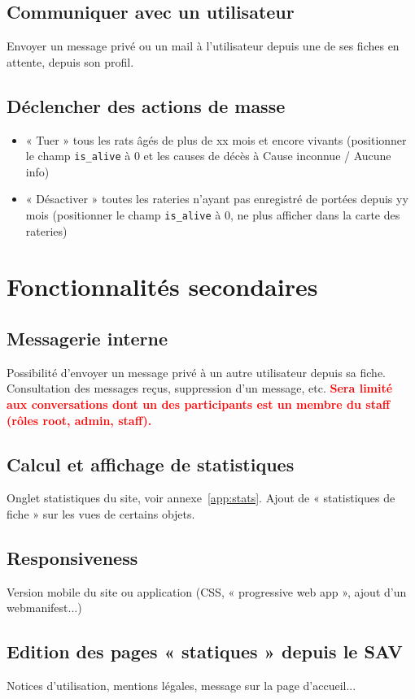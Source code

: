 \documentclass[a4paper,10pt]{article}
\newcommand\desire[1]{\noindent\textbf{\textcolor{red}{#1}}}
\begin{document}
\subsection{Communiquer avec un utilisateur}
Envoyer un message privé ou un mail à l'utilisateur depuis une de ses fiches en attente, depuis son profil.

\subsection{Déclencher des actions de masse}
\begin{itemize}
\item « Tuer » tous les rats âgés de plus de xx mois et encore vivants (positionner le champ \texttt{is\_alive} à 0 et les causes de décès à Cause inconnue / Aucune info)
\item « Désactiver » toutes les rateries n'ayant pas enregistré de portées depuis yy mois (positionner le champ \texttt{is\_alive} à 0, ne plus afficher dans la carte des rateries)
\end{itemize}


\section{Fonctionnalités secondaires}
\subsection{Messagerie interne}
Possibilité d'envoyer un message privé à un autre utilisateur depuis sa fiche. Consultation des messages reçus, suppression d'un message, etc. \desire{Sera limité aux conversations dont un des participants est un membre du staff (rôles root, admin, staff).}

\subsection{Calcul et affichage de statistiques}
Onglet statistiques du site, voir annexe~\ref{app:stats}. Ajout de « statistiques de fiche » sur les vues de certains objets.

\subsection{Responsiveness}
Version mobile du site ou application (CSS, « progressive web app », ajout d'un webmanifest...)

\subsection{Edition des pages « statiques » depuis le SAV}
Notices d'utilisation, mentions légales, message sur la page d'accueil...
\end{document}
